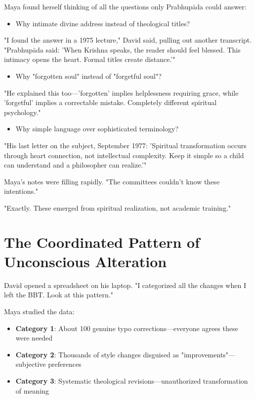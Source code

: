 \documentclass[11pt,twoside]{book}
\begin{document}
Maya found herself thinking of all the questions only Prabhupāda could answer:

\begin{itemize}
\item Why intimate divine address instead of theological titles?
\end{itemize}

"I found the answer in a 1975 lecture," David said, pulling out another transcript. "Prabhupāda said: 'When Krishna speaks, the reader should feel blessed. This intimacy opens the heart. Formal titles create distance.'"

\begin{itemize}
\item Why "forgotten soul" instead of "forgetful soul"?
\end{itemize}

"He explained this too—'forgotten' implies helplessness requiring grace, while 'forgetful' implies a correctable mistake. Completely different spiritual psychology."

\begin{itemize}
\item Why simple language over sophisticated terminology?
\end{itemize}

"His last letter on the subject, September 1977: 'Spiritual transformation occurs through heart connection, not intellectual complexity. Keep it simple so a child can understand and a philosopher can realize.'"

Maya's notes were filling rapidly. "The committees couldn't know these intentions."

"Exactly. These emerged from spiritual realization, not academic training."
\section*{The Coordinated Pattern of Unconscious Alteration}
\label{sec:orgf4831c4}

David opened a spreadsheet on his laptop. "I categorized all the changes when I left the BBT. Look at this pattern."

Maya studied the data:
\begin{itemize}
\item \textbf{\textbf{Category 1}}: About 100 genuine typo corrections—everyone agrees these were needed
\item \textbf{\textbf{Category 2}}: Thousands of style changes disguised as "improvements"—subjective preferences
\item \textbf{\textbf{Category 3}}: Systematic theological revisions—unauthorized transformation of meaning
\end{itemize}
\end{document}
